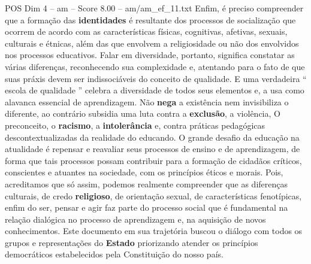 \begin{textsample}{POS Dim 4 – am – Score 8.00 – am/am\_ef\_11.txt}
Enfim, é preciso compreender que a formação das \textbf{identidades} é resultante dos processos de socialização que ocorrem de acordo com as características físicas, cognitivas, afetivas, sexuais, culturais e étnicas, além das que envolvem a religiosidade ou não dos envolvidos nos processos educativos.
Falar em diversidade, portanto, significa constatar as várias diferenças, reconhecendo sua complexidade e, atentando para o fato de que suas práxis devem ser indissociáveis do conceito de qualidade.
E uma verdadeira “ escola de qualidade ” celebra a diversidade de todos seus elementos e, a usa como alavanca essencial de aprendizagem.
Não \textbf{nega} a existência nem invisibiliza o diferente, ao contrário subsidia uma luta contra a \textbf{exclusão}, a violência, O preconceito, o \textbf{racismo}, a \textbf{intolerância} e, contra práticas pedagógicas descontextualizadas da realidade do educando.
O grande desafio da educação na atualidade é repensar e reavaliar seus processos de ensino e de aprendizagem, de forma que tais processos possam contribuir para a formação de cidadãos críticos, conscientes e atuantes na sociedade, com os princípios éticos e morais.
Pois, acreditamos que só assim, podemos realmente compreender que as diferenças culturais, de credo \textbf{religioso}, de orientação sexual, de características fenotípicas, enfim do ser, pensar e agir faz parte do processo social que é fundamental na relação dialógica no processo de aprendizagem e, na aquisição de novos conhecimentos.
Este documento em sua trajetória buscou o diálogo com todos os grupos e representações do \textbf{Estado} priorizando atender os princípios democráticos estabelecidos pela Constituição do nosso país.

\end{textsample}
